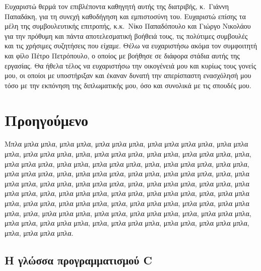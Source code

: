 \documentclass[diploma]{softlab-thesis}
\begin{document}

\begin{acknowledgementsgr}
Ευχαριστώ θερμά τον επιβλέποντα καθηγητή αυτής της διατριβής,
κ.~Γιάννη Παπαδάκη, για τη συνεχή καθοδήγηση και εμπιστοσύνη
του. Ευχαριστώ επίσης τα μέλη της συμβουλευτικής επιτροπής,
κ.κ.~Νίκο Παπαδόπουλο και Γιώργο Νικολάου για την πρόθυμη και
πάντα αποτελεσματική βοήθειά τους, τις πολύτιμες συμβουλές και
τις χρήσιμες συζητήσεις που είχαμε.  Θέλω να ευχαριστήσω ακόμα
τον συμφοιτητή και φίλο Πέτρο Πετρόπουλο, ο οποίος με βοήθησε σε
διάφορα στάδια αυτής της εργασίας.  Θα ήθελα τέλος να ευχαριστήσω
την οικογένειά μου και κυρίως τους γονείς μου, οι οποίοι με
υποστήριξαν και έκαναν δυνατή την απερίσπαστη ενασχόλησή μου τόσο
με την εκπόνηση της διπλωματικής μου, όσο και συνολικά με τις
σπουδές μου.
\end{acknowledgementsgr}



\tableofcontents



\mainmatter



\chapter{Προηγούμενο}

Μπλα μπλα μπλα, μπλα μπλα, μπλα μπλα μπλα, μπλα μπλα μπλα μπλα,
μπλα μπλα μπλα, μπλα μπλα μπλα, μπλα, μπλα μπλα μπλα, μπλα μπλα,
μπλα μπλα μπλα, μπλα, μπλα μπλα μπλα, μπλα μπλα, μπλα μπλα μπλα,
μπλα, μπλα μπλα μπλα, μπλα μπλα, μπλα μπλα μπλα, μπλα, μπλα μπλα
μπλα, μπλα μπλα, μπλα μπλα μπλα, μπλα, μπλα μπλα μπλα, μπλα μπλα,
μπλα μπλα μπλα, μπλα, μπλα μπλα μπλα, μπλα μπλα, μπλα μπλα μπλα,
μπλα, μπλα μπλα μπλα, μπλα μπλα, μπλα μπλα μπλα, μπλα, μπλα μπλα
μπλα, μπλα μπλα, μπλα μπλα μπλα, μπλα, μπλα μπλα μπλα, μπλα μπλα,
μπλα μπλα μπλα, μπλα, μπλα μπλα μπλα, μπλα μπλα, μπλα μπλα μπλα,
μπλα, μπλα μπλα μπλα, μπλα μπλα, μπλα μπλα μπλα, μπλα, μπλα μπλα
μπλα, μπλα μπλα, μπλα μπλα μπλα, μπλα, μπλα μπλα μπλα.


\section{Η γλώσσα προγραμματισμού C}
\end{document}
